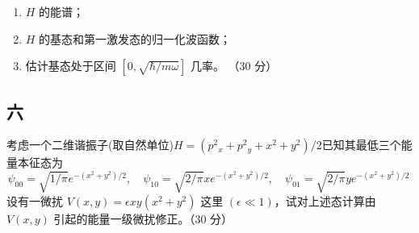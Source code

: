 \begin{enumerate}
    \item $H$ 的能谱；
    \item $H$ 的基态和第一激发态的归一化波函数；
    \item 估计基态处于区间 $[0, \sqrt{\hbar/m\omega}]$ 几率。 （30 分）
\end{enumerate}

\subsection{六}
考虑一个二维谐振子(取自然单位)$H= (p^2{_x} + p^2{_y}+ x^2 + y^2)/{2}$已知其最低三个能量本征态为$$\psi_{00} = \sqrt{1/\pi} e^{-(x^2 + y^2)/2}, \quad \psi_{10} = \sqrt{2/\pi} x e^{-(x^2 + y^2)/2}, \quad \psi_{01} = \sqrt{2/\pi} y e^{-(x^2 + y^2)/2}~$$
设有一微扰 $V(x, y) = \epsilon xy (x^2 + y^2)$ 这里 $(\epsilon \ll 1)$，试对上述态计算由 $V(x, y)$ 引起的能量一级微扰修正。（30 分）